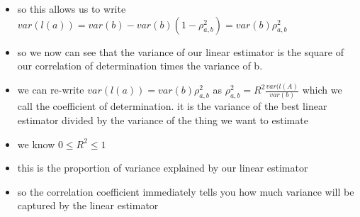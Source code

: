 \documentclass{article}
\begin{document}
\begin{itemize}
\item so this allows us to write $var(l(a))=var(b)-var(b)(1-\rho_{a,b}^2)=var(b)\rho_{a,b}^2$ 
\item so we now can see that the variance of our linear estimator is the square of our correlation of determination times the variance of b. 
\item we can re-write $var(l(a))=var(b)\rho_{a,b}^2$  as $\rho_{a,b}^2=R^2\frac{var(l(A)}{var(b)}$ which we call the coefficient of determination. it is the variance of the best linear estimator divided by the variance of the thing we want to estimate 
\item we know $0\leq R^2\leq 1$
\item this is the proportion of variance explained by our linear estimator
\item so the correlation coefficient immediately tells you how much variance will be captured by the linear estimator

\end{itemize}
\end{document}

